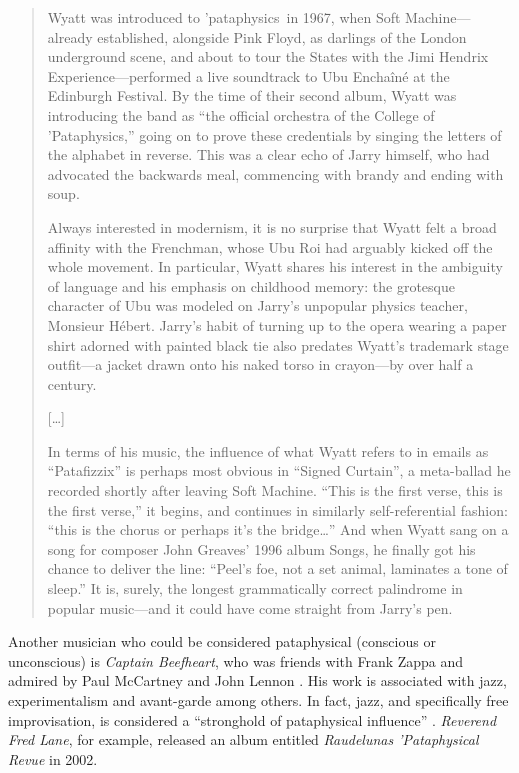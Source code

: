 \begin{quotation}
  Wyatt was introduced to {'}pataphysics in 1967, when Soft Machine---already established, alongside Pink Floyd, as darlings of the London underground scene, and about to tour the States with the Jimi Hendrix Experience---performed a live soundtrack to Ubu Enchaîné at the Edinburgh Festival. By the time of their second album, Wyatt was introducing the band as ``the official orchestra of the College of {'}Pataphysics,'' going on to prove these credentials by singing the letters of the alphabet in reverse. This was a clear echo of Jarry himself, who had advocated the backwards meal, commencing with brandy and ending with soup.

  Always interested in modernism, it is no surprise that Wyatt felt a broad affinity with the Frenchman, whose Ubu Roi had arguably kicked off the whole movement. In particular, Wyatt shares his interest in the ambiguity of language and his emphasis on childhood memory: the grotesque character of Ubu was modeled on Jarry's unpopular physics teacher, Monsieur Hébert. Jarry's habit of turning up to the opera wearing a paper shirt adorned with painted black tie also predates Wyatt's trademark stage outfit---a jacket drawn onto his naked torso in crayon---by over half a century.
  
  [\ldots]

  In terms of his music, the influence of what Wyatt refers to in emails as ``Patafizzix'' is perhaps most obvious in ``Signed Curtain'', a meta-ballad he recorded shortly after leaving Soft Machine. ``This is the first verse, this is the first verse,'' it begins, and continues in similarly self-referential fashion: ``this is the chorus or perhaps it's the bridge\ldots'' And when Wyatt sang on a song for composer John Greaves' 1996 album Songs, he finally got his chance to deliver the line: ``Peel's foe, not a set animal, laminates a tone of sleep.'' It is, surely, the longest grammatically correct palindrome in popular music---and it could have come straight from Jarry's pen.
\end{quotation}

Another musician who could be considered pataphysical (conscious or unconscious) is \emph{Captain Beefheart}, who was friends with Frank Zappa and admired by Paul McCartney and John Lennon \autocite{Hermes2010}. His work is associated with jazz, experimentalism and avant-garde among others. In fact, jazz, and specifically free improvisation, is considered a ``stronghold of pataphysical influence'' \autocite{Hugill2012}. \emph{Reverend Fred Lane}, for example, released an album entitled \textit{Raudelunas ’Pataphysical Revue} in 2002.


